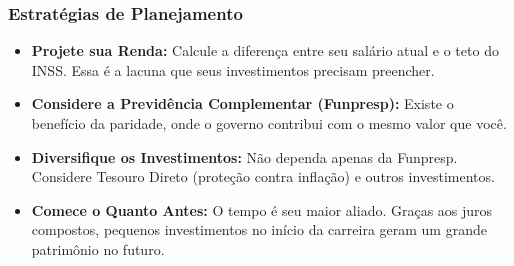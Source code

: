 \begin{frame}[c]\frametitle{Estratégias de Planejamento}
  \begin{itemize}
    \item \textbf{Projete sua Renda:} Calcule a diferença entre seu salário atual e o teto do INSS. Essa é a lacuna que seus investimentos precisam preencher.
    \item \textbf{Considere a Previdência Complementar (Funpresp):} Existe o benefício da paridade, onde o governo contribui com o mesmo valor que você.
    \item \textbf{Diversifique os Investimentos:} Não dependa apenas da Funpresp. Considere Tesouro Direto (proteção contra inflação) e outros investimentos.
    \item \textbf{Comece o Quanto Antes:} O tempo é seu maior aliado. Graças aos juros compostos, pequenos investimentos no início da carreira geram um grande patrimônio no futuro.
  \end{itemize}
\end{frame}